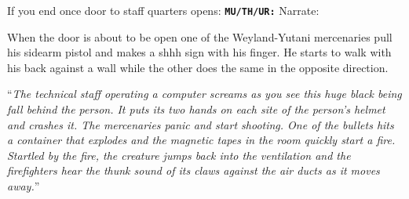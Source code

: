 \begin{rpg-commentbox}{If you end once door to staff quarters opens:}
    \texttt{\textbf{MU/TH/UR:}} Narrate:

    When the door is about to be open one of the Weyland-Yutani mercenaries pull his sidearm pistol and makes a shhh sign with his finger. He starts to walk with his back against a wall while the other does the same in the opposite direction.
    
    ``\textit{The technical staff operating a computer screams as you see this huge black being fall behind the person. It puts its two hands on each site of the person's helmet and crashes it. The mercenaries panic and start shooting. One of the bullets hits a container that explodes and the magnetic tapes in the room quickly start a fire. Startled by the fire, the creature jumps back into the ventilation and the firefighters hear the thunk sound of its claws against the air ducts as it moves away.}''
\end{rpg-commentbox}